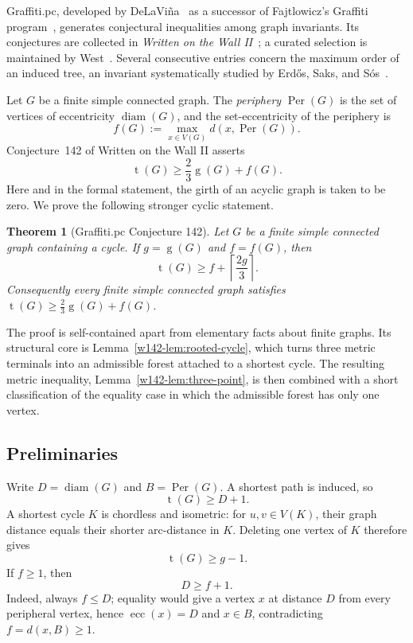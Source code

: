 \documentclass[11pt]{article}
\numberwithin{equation}{section}
\newtheorem{theorem}{Theorem}[section]
\theoremstyle{remark}
\newcommand{\tr}{\operatorname{t}}
\newcommand{\gr}{\operatorname{g}}
\newcommand{\diam}{\operatorname{diam}}
\newcommand{\ecc}{\operatorname{ecc}}
\newcommand{\Per}{\operatorname{Per}}
\begin{document}
Graffiti.pc, developed by DeLaVi\~na~\cite{DeL01,DeLhistory} as a successor
of Fajtlowicz's Graffiti program~\cite{Faj88}, generates conjectural
inequalities among graph invariants.  Its conjectures are collected in
\emph{Written on the Wall II}~\cite{WOWII}; a curated selection is maintained
by West~\cite{WestReg}.  Several consecutive entries concern the maximum
order of an induced tree, an invariant systematically studied by Erd\H{o}s,
Saks, and S\'os~\cite{ESS86}.

Let $G$ be a finite simple connected graph.  The \emph{periphery}
$\Per(G)$ is the set of vertices of eccentricity $\diam(G)$, and the
set-eccentricity of the periphery is
\[
 f(G):=\max_{x\in V(G)} d(x,\Per(G)).
\]
Conjecture~142 of Written on the Wall II asserts
\[
  \tr(G)\ge \frac23\gr(G)+f(G).
\]
Here and in the formal statement, the girth of an acyclic graph is taken to
be zero.  We prove the following stronger cyclic statement.

\begin{theorem}[Graffiti.pc Conjecture 142]\label{w142-thm:main}
Let $G$ be a finite simple connected graph containing a cycle.  If
$g=\gr(G)$ and $f=f(G)$, then
\[
  \tr(G)\ge f+\left\lceil\frac{2g}{3}\right\rceil .
\]
Consequently every finite simple connected graph satisfies
$\tr(G)\ge \frac23\gr(G)+f(G)$.
\end{theorem}

The proof is self-contained apart from elementary facts about finite graphs.
Its structural core is Lemma~\ref{w142-lem:rooted-cycle}, which turns three metric
terminals into an admissible forest attached to a shortest cycle.  The
resulting metric inequality, Lemma~\ref{w142-lem:three-point}, is then combined
with a short classification of the equality case in which the admissible
forest has only one vertex.

\subsection{Preliminaries}

Write $D=\diam(G)$ and $B=\Per(G)$.  A shortest path is induced, so
\begin{equation}\label{w142-eq:diam-path}
  \tr(G)\ge D+1.
\end{equation}
A shortest cycle $K$ is chordless and isometric: for $u,v\in V(K)$, their
graph distance equals their shorter arc-distance in $K$.  Deleting one
vertex of $K$ therefore gives
\begin{equation}\label{w142-eq:cycle-base}
  \tr(G)\ge g-1.
\end{equation}
If $f\ge1$, then
\begin{equation}\label{w142-eq:D-f}
  D\ge f+1.
\end{equation}
Indeed, always $f\le D$; equality would give a vertex $x$ at distance $D$
from every peripheral vertex, hence $\ecc(x)=D$ and $x\in B$, contradicting
$f=d(x,B)\ge1$.
\end{document}
